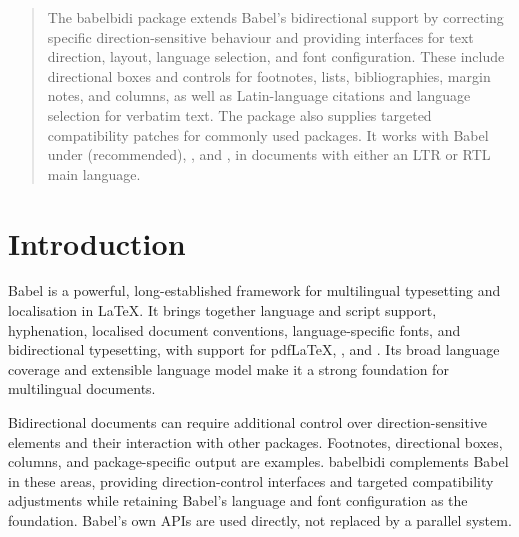 \documentclass{ltxdoc}
\makeatletter
\newcommand*\bbdManualContents{%
    \pdfbookmark[0]{\contentsname}{bbd-manual-contents}%
    \begingroup
    \small
    \setlength{\parindent}{0pt}%
    \begin{multicols}{2}[\section*{\contentsname}]
        \@starttoc{toc}%
    \end{multicols}%
    \endgroup
}
\makeatother
\begin{document}
    \pagestyle{amikhteh-logo}
    \AmikhtehLogoFooterTitle{}

    \begin{abstract}
        \setlength{\rightskip}{0pt}%
        \setlength{\parfillskip}{0pt plus 1fil}%
        \relax
        \relax
        \setlength{\emergencystretch}{2em}%
        The \textsf{babelbidi} package extends Babel's bidirectional
        support by correcting specific direction-sensitive behaviour
        and providing interfaces for text direction, layout, language
        selection, and font configuration. These include directional
        boxes and controls for footnotes, lists, bibliographies, margin
        notes, and columns, as well as Latin-language citations and
        language selection for verbatim text. The package also supplies
        targeted compatibility patches for commonly used packages.
        It works with Babel under \LuaTeX (recommended), \XeTeX, and
        \pdfTeX, in documents with either an LTR or RTL main language.
    \end{abstract}



    \AmikhtehLogoFooterTitle{\contentsname}
    \bbdManualContents
    \clearpage


    \section{Introduction}
    \label{sec:introduction}

    Babel is a powerful, long-established framework for multilingual
    typesetting and localisation in \LaTeX. It brings together language
    and script support, hyphenation, localised document conventions,
    language-specific fonts, and bidirectional typesetting, with support
    for pdf\LaTeX, \XeLaTeX, and \LuaLaTeX. Its broad language coverage
    and extensible language model make it a strong foundation for
    multilingual documents.

    Bidirectional documents can require additional control over
    direction-sensitive elements and their interaction with other
    packages. Footnotes, directional boxes, columns, and package-specific
    output are examples. \textsf{babelbidi} complements Babel in these
    areas, providing direction-control interfaces and targeted
    compatibility adjustments while retaining Babel's language and font
    configuration as the foundation. Babel's own APIs are used directly,
    not replaced by a parallel system.
\end{document}
